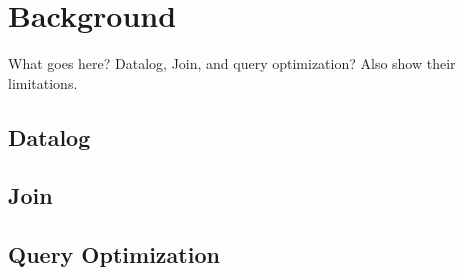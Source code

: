 \chapter{Background}
\label{sec:background}

What goes here? Datalog, Join, and query optimization? Also show their limitations.

\section{Datalog}
\label{sec:datalog}

\section{Join}
\label{sec:join}

\section{Query Optimization}
\label{sec:query-optimization}